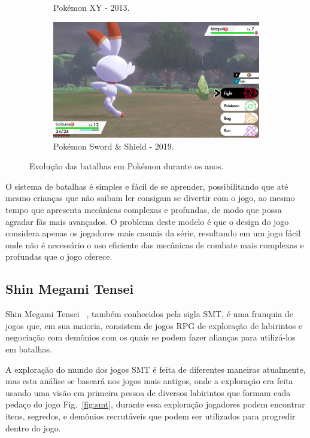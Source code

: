 \begin{figure}[h!]
\begin{subfigure}[b]{0.6\linewidth}
    \caption{Pokémon XY - 2013.}
  \end{subfigure}
  \begin{subfigure}[b]{0.6\linewidth}
    \includegraphics[width=\linewidth]{swsh.jpg}
    \caption{Pokémon Sword \& Shield - 2019.}
  \end{subfigure}
  \caption{Evolução das batalhas em Pokémon durante os anos.}
  \label{fig:pokemon2}
\end{figure}

O sistema de batalhas é simples e fácil de se aprender, possibilitando que até mesmo crianças que não saibam ler consigam se divertir com o jogo, ao mesmo tempo que apresenta mecânicas complexas e profundas, de modo que possa agradar fãs mais avançados. O problema deste modelo é que o design do jogo considera apenas os jogadores mais casuais da série, resultando em um jogo fácil onde não é necessário o uso eficiente das mecânicas de combate mais complexas e profundas que o jogo oferece.

\subsection{Shin Megami Tensei}

Shin Megami Tensei ~\cite{SMT}, também conhecidos pela sigla SMT, é uma franquia de jogos que, em sua maioria, consistem de jogos RPG de exploração de labirintos e negociação com demônios com os quais se podem fazer alianças para utilizá-los em batalhas.

	A exploração do mundo dos jogos SMT é feita de diferentes maneiras atualmente, mas esta análise se baseará nos jogos mais antigos, onde a exploração era feita usando uma visão em primeira pessoa de diversos labirintos que formam cada pedaço do jogo Fig.~\ref{fig:smt}, durante essa exploração jogadores podem encontrar itens, segredos, e demônios recrutáveis que podem ser utilizados para progredir dentro do jogo.

